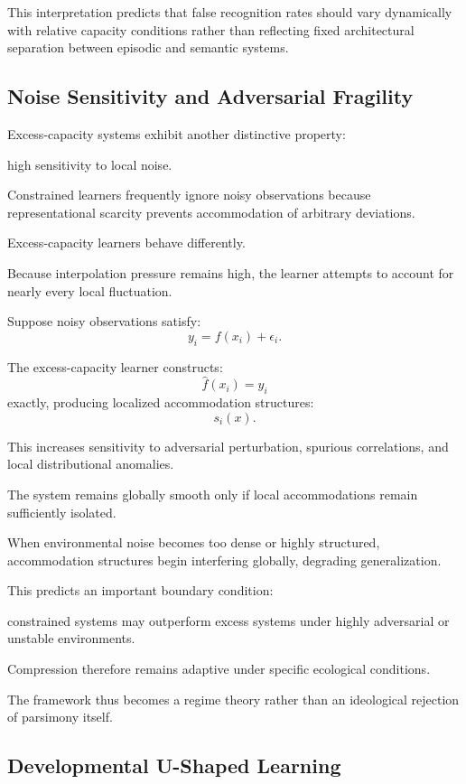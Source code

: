 \documentclass[12pt,a4paper]{article}
\begin{document}
This interpretation predicts that false recognition rates should vary dynamically with relative capacity conditions rather than reflecting fixed architectural separation between episodic and semantic systems.

\subsection{Noise Sensitivity and Adversarial Fragility}

Excess-capacity systems exhibit another distinctive property:

high sensitivity to local noise.

Constrained learners frequently ignore noisy observations because representational scarcity prevents accommodation of arbitrary deviations.

Excess-capacity learners behave differently.

Because interpolation pressure remains high, the learner attempts to account for nearly every local fluctuation.

Suppose noisy observations satisfy:
\[
y_i
=
f(x_i)
+
\epsilon_i.
\]

The excess-capacity learner constructs:
\[
\hat{f}(x_i)=y_i
\]
exactly, producing localized accommodation structures:
\[
s_i(x).
\]

This increases sensitivity to adversarial perturbation, spurious correlations, and local distributional anomalies.

The system remains globally smooth only if local accommodations remain sufficiently isolated.

When environmental noise becomes too dense or highly structured, accommodation structures begin interfering globally, degrading generalization.

This predicts an important boundary condition:

constrained systems may outperform excess systems under highly adversarial or unstable environments.

Compression therefore remains adaptive under specific ecological conditions.

The framework thus becomes a regime theory rather than an ideological rejection of parsimony itself.

\subsection{Developmental U-Shaped Learning}
\end{document}
